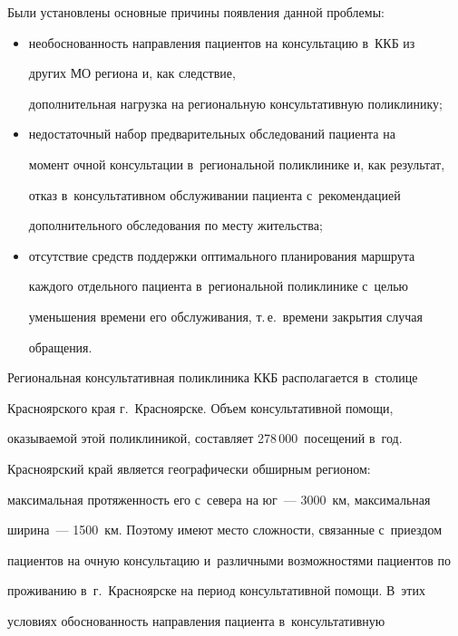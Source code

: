   


  Были установлены основные причины появления данной проблемы:


  \begin{itemize} %


  \item  необоснованность направления пациентов на консультацию в~ККБ из 


других МО региона и, как следствие, 


дополнительная нагрузка на региональную консультативную поликлинику;


  \item недостаточный набор предварительных обследований пациента на 


момент очной консультации в~региональной поликлинике и, как результат, 


отказ в~консультативном обслуживании пациента с~рекомендацией 


дополнительного обследования по месту жительства;


  \item отсутствие средств поддержки оптимального планирования маршрута 


каж\-до\-го отдельного пациента в~региональной поликлинике с~целью 


уменьшения времени его обслуживания, т.\,е.\ времени закрытия случая 


обращения.


  \end{itemize}


  


  Региональная консультативная поликлиника ККБ располагается в~столице 


Красноярского края г.~Красноярске. Объем консультативной помощи, 


оказываемой этой поликлиникой, составляет 278\,000~посещений в~год. 


Красноярский край является географически обширным регионом: 


максимальная протяженность его с~севера на юг~--- 3000~км, максимальная 


ширина~--- 1500~км. Поэтому имеют место сложности, связанные с~приездом 


пациентов на очную консультацию и~различными возможностями пациентов по 


проживанию в~г.~Красноярске на период консультативной помощи. В~этих 


условиях обоснованность направления пациента в~консультативную 


